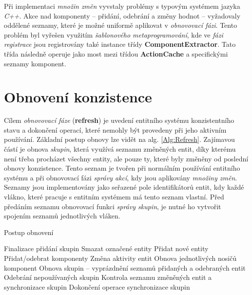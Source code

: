 Při implementaci \emph{množin změn} vyvstaly problémy s typovým systémem jazyka \emph{C++}. Akce nad komponenty -- přidání, odebrání a změny hodnot -- vyžadovaly oddělené seznamy, které je možné uniformě aplikovat v \emph{obnovovací fázi}. Tento problém byl vyřešen využitím \emph{šablonového metaprogramování}, kde ve \emph{fázi registrace} jsou registrovány také instance třídy \textbf{ComponentExtractor}. Tato třída následně operuje jako most mezi třídou \textbf{ActionCache} a specifickými seznamy komponent.

\section{Obnovení konzistence}

Cílem \emph{obnovovací fáze} (\textbf{refresh}) je uvedení entitního systému konzistentního stavu a dokončení operací, které nemohly být provedeny při jeho aktivním používání. Základní postup obnovy lze vidět na alg. \ref{Alg:Refresh}. Zajímavou částí je obnova \emph{skupin}, která využívá seznamu změněných entit, díky kterému není třeba procházet všechny entity, ale pouze ty, které byly změněny od poslední obnovy konzistence. Tento seznam je tvořen při normálním používání entitního systému a při obnovovací fázi \emph{správy akcí}, kdy jsou aplikovány \emph{množiny změn}. Seznamy jsou implementovány jako seřazené pole identifikátorů entit, kdy každé vlákno, které pracuje s entitním systémem má tento seznam vlastní. Před předáním seznamu obnovovací funkci \emph{správy skupin}, je nutné ho vytvořit spojením seznamů jednotlivých vláken.

\begin{algorithm}
	\caption{Postup obnovení}
	\label{Alg:Refresh}
	
	\begin{algorithmic}[1]
		
			\EMBlockStart
				\State Finalizace přidání skupin
			\EMBlockEnd
			\ACBlockStart
				\State Smazat označené entity
				\State Přidat nové entity
				\State Přidat/odebrat komponenty
				\State Změna aktivity entit
			\ACBlockEnd
			\CMBlockStart
				\State Obnova jednotlivých nosičů komponent
			\CMBlockEnd
			\GMBlockStart
				\State Obnova skupin -- vyprázdnění seznamů přidaných a odebraných entit
				\State Odebrání nepoužívaných skupin
				\State Kontrola seznamu změněných entit a synchronizace skupin
				\State Dokončení operace synchronizace skupin
			\GMBlockEnd
		\EndFunction
	\end{algorithmic}
\end{algorithm}

